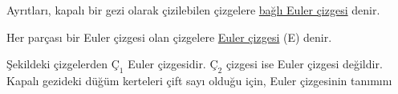 \documentclass{amsbook}
\begin{document}
    \chapter{}
    \theoremstyle{definition}
    \begin{definition}
        Ayrıtları, kapalı bir gezi olarak çizilebilen çizgelere \underline{bağlı Euler çizgesi} denir.
    \end{definition}
    \theoremstyle{definition}
    \begin{definition}
        Her parçası bir Euler çizgesi olan çizgelere \underline{Euler çizgesi} (E) denir.
    \end{definition}
    Şekildeki çizgelerden $Ç_{1}$ Euler çizgesidir. $Ç_{2}$ çizgesi ise Euler çizgesi değildir. Kapalı gezideki düğüm kerteleri çift sayı olduğu için, Euler çizgesinin tanımını
\end{document}
